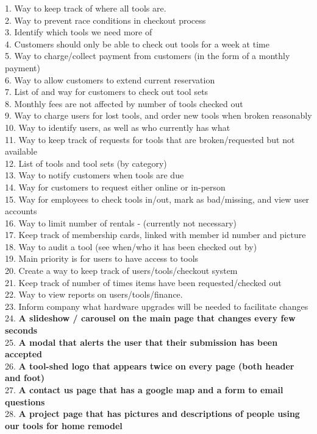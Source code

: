 \documentclass[12pt,letterpaper]{article}
\begin{document}
1. Way to keep track of where all tools are.\\
2. Way to prevent race conditions in checkout process\\
3. Identify which tools we need more of\\
4. Customers should only be able to check out tools for a week at time\\
5. Way to charge/collect payment from customers (in the form of a monthly payment)\\
6. Way to allow customers to extend current reservation\\
7. List of and way for customers to check out tool sets\\
8. Monthly fees are not affected by number of tools checked out\\
9. Way to charge users for lost tools, and order new tools when broken reasonably\\
10. Way to identify users, as well as who currently has what\\
11. Way to keep track of requests for tools that are broken/requested but not available\\
12. List of tools and tool sets (by category)\\
13. Way to notify customers when tools are due\\
14. Way for customers to request either online or in-person\\
15. Way for employees to check tools in/out, mark as bad/missing, and view user accounts\\
16. Way to limit number of rentals - (currently not necessary)\\
17. Keep track of membership cards, linked with member id number and picture\\
18. Way to audit a tool (see when/who it has been checked out by)\\
19. Main priority is for users to have access to tools\\
20. Create a way to keep track of users/tools/checkout system\\
21. Keep track of number of times items have been requested/checked out\\
22. Way to view reports on users/tools/finance.\\
23. Inform company what hardware upgrades will be needed to facilitate changes\\
24. \textbf{A slideshow / carousel on the main page that changes every few seconds}\\
25. \textbf{A modal that alerts the user that their submission has been accepted}\\
26. \textbf{A tool-shed logo that appears twice on every page (both header and foot)}\\
27. \textbf{A contact us page that has a google map and a form to email questions}\\
28. \textbf{A project page that has pictures and descriptions of people using our tools for home remodel }
\end{document}
